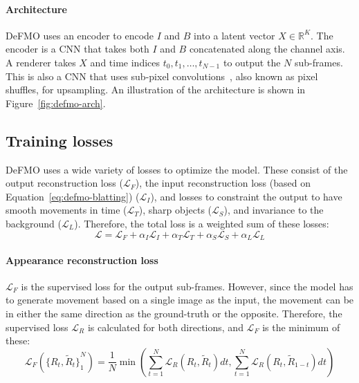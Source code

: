 \paragraph{Architecture}
DeFMO uses an encoder to encode $I$ and $B$ into a latent vector $X \in \mathbb{R}^K$.
The encoder is a CNN that takes both $I$ and $B$ concatenated along the channel axis.
A renderer takes $X$ and time indices $t_0, t_1, \ldots, t_{N-1}$ to output the $N$ sub-frames.
This is also a CNN that uses sub-pixel convolutions~\citep{pixelshuffle}, also known as pixel shuffles, for upsampling.
An illustration of the architecture is shown in Figure~\ref{fig:defmo-arch}.

\subsection{Training losses}
    DeFMO uses a wide variety of losses to optimize the model.
    These consist of the output reconstruction loss ($\mathcal{L}_F$), the input reconstruction loss (based on Equation~\ref{eq:defmo-blatting}) ($\mathcal{L}_I$), and losses to constraint the output to have smooth movements in time ($\mathcal{L}_T$), sharp objects ($\mathcal{L}_S$), and invariance to the background ($\mathcal{L}_L$).
    Therefore, the total loss is a weighted sum of these losses:
    \begin{equation}
        \mathcal{L} = \mathcal{L}_F + \alpha_I \mathcal{L}_I + \alpha_T \mathcal{L}_T + \alpha_S \mathcal{L}_S + \alpha_L \mathcal{L}_L
    \end{equation}

    \paragraph{Appearance reconstruction loss}
    $\mathcal{L}_F$ is the supervised loss for the output sub-frames.
    However, since the model has to generate movement based on a single image as the input, the movement can be in either the same direction as the ground-truth or the opposite.
    Therefore, the supervised loss $\mathcal{L}_R$ is calculated for both directions, and $\mathcal{L}_F$ is the minimum of these:
    \begin{equation}
        \mathcal{L}_F({\{ R_t, \tilde{R}_t \}}_1^N) = \frac{1}{N} \min \left( \sum_{t=1}^N \mathcal{L}_R(R_t, \tilde{R}_t) dt, \sum_{t=1}^N \mathcal{L}_R(R_t, \tilde{R}_{1-t}) dt \right)
    \end{equation}

